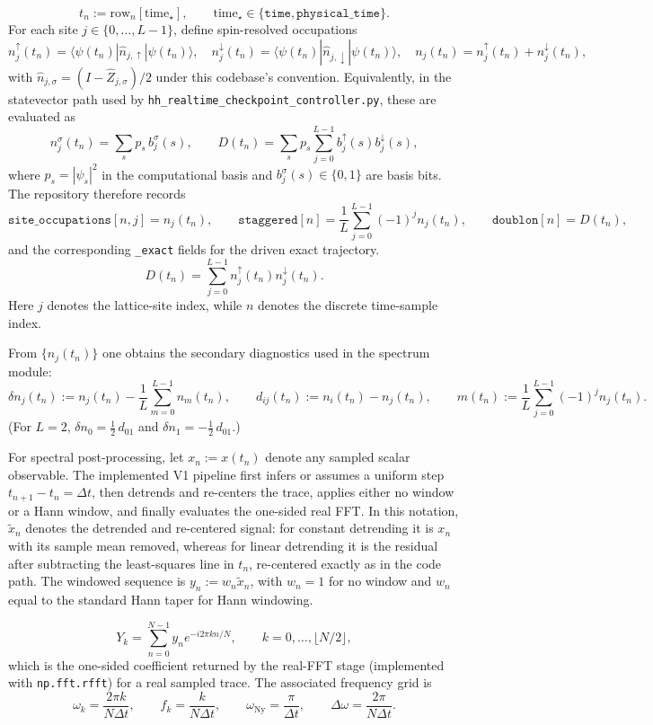 \documentclass[11pt]{article}
\begin{document}
\[
t_n := \text{row}_n[\text{time}_\star],\qquad
\text{time}_\star \in \{\texttt{time},\texttt{physical\_time}\}.
\]
For each site $j\in\{0,\dots,L-1\}$, define spin-resolved occupations
\[
n^{\uparrow}_{j}(t_n)=\langle \psi(t_n)|\hat n_{j,\uparrow}|\psi(t_n)\rangle,\quad
n^{\downarrow}_{j}(t_n)=\langle \psi(t_n)|\hat n_{j,\downarrow}|\psi(t_n)\rangle,\quad
n_{j}(t_n)=n^{\uparrow}_{j}(t_n)+n^{\downarrow}_{j}(t_n),
\]
with $\hat n_{j,\sigma}=(I-\hat Z_{j,\sigma})/2$ under this codebase's convention.  Equivalently, in the statevector path used by \texttt{hh\_realtime\_checkpoint\_controller.py}, these are evaluated as
\[
n^{\sigma}_{j}(t_n)=\sum_{s}p_s\,b^{\sigma}_{j}(s),\qquad
D(t_n)=\sum_{s}p_s\sum_{j=0}^{L-1} b^{\uparrow}_{j}(s)b^{\downarrow}_{j}(s),
\]
where $p_s=|\psi_s|^2$ in the computational basis and $b^{\sigma}_{j}(s)\in\{0,1\}$ are basis bits.  The repository therefore records
\[
\texttt{site\_occupations}[n,j]=n_j(t_n),\qquad
\texttt{staggered}[n]=\frac1L\sum_{j=0}^{L-1}(-1)^j n_j(t_n),\qquad
\texttt{doublon}[n]=D(t_n),
\]
and the corresponding \texttt{\_exact} fields for the driven exact trajectory.
\[
D(t_n)=\sum_{j=0}^{L-1} n^{\uparrow}_{j}(t_n)n^{\downarrow}_{j}(t_n).
\]
Here $j$ denotes the lattice-site index, while $n$ denotes the discrete time-sample index.

From $\{n_j(t_n)\}$ one obtains the secondary diagnostics used in the spectrum module:
\[
\delta n_j(t_n):=n_j(t_n)-\frac1L\sum_{m=0}^{L-1}n_m(t_n),
\qquad
d_{ij}(t_n):=n_i(t_n)-n_j(t_n),
\qquad
m(t_n):=\frac1L\sum_{j=0}^{L-1}(-1)^j n_j(t_n).
\]
(For $L=2$, $\delta n_0=\frac12\,d_{01}$ and $\delta n_1=-\frac12\,d_{01}$.)

For spectral post-processing, let $x_n:=x(t_n)$ denote any sampled scalar observable.  The implemented V1 pipeline first infers or assumes a uniform step $t_{n+1}-t_n=\Delta t$, then detrends and re-centers the trace, applies either no window or a Hann window, and finally evaluates the one-sided real FFT.  In this notation, $\tilde x_n$ denotes the detrended and re-centered signal: for constant detrending it is $x_n$ with its sample mean removed, whereas for linear detrending it is the residual after subtracting the least-squares line in $t_n$, re-centered exactly as in the code path.  The windowed sequence is $y_n:=w_n\tilde x_n$, with $w_n=1$ for no window and $w_n$ equal to the standard Hann taper for Hann windowing.

\[
Y_k = \sum_{n=0}^{N-1} y_n e^{-i2\pi kn/N},\qquad
k=0,\dots,\lfloor N/2\rfloor,
\]
which is the one-sided coefficient returned by the real-FFT stage (implemented with \texttt{np.fft.rfft}) for a real sampled trace.  The associated frequency grid is
\[
\omega_k=\frac{2\pi k}{N\Delta t},\qquad
f_k=\frac{k}{N\Delta t},\qquad
\omega_{\mathrm{Ny}}=\frac{\pi}{\Delta t},\qquad
\Delta\omega=\frac{2\pi}{N\Delta t}.
\]
\end{document}
